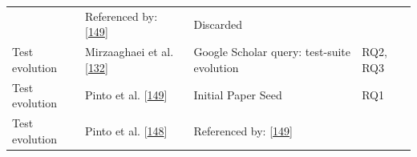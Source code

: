 \documentclass[]{book}
\begin{document}
\begin{longtable}[]{@{}llll@{}}
\begin{minipage}[t]{0.16\columnwidth}
\end{minipage} & \begin{minipage}[t]{0.50\columnwidth}\raggedright\strut
Referenced by:
{[}\protect\hyperlink{ref-pinto2012understanding}{149}{]}\strut
\end{minipage} & \begin{minipage}[t]{0.04\columnwidth}\raggedright\strut
Discarded\strut
\end{minipage}\tabularnewline
\begin{minipage}[t]{0.18\columnwidth}\raggedright\strut
Test evolution\strut
\end{minipage} & \begin{minipage}[t]{0.16\columnwidth}\raggedright\strut
Mirzaaghaei et al.
{[}\protect\hyperlink{ref-supportingtestsuite}{132}{]}\strut
\end{minipage} & \begin{minipage}[t]{0.50\columnwidth}\raggedright\strut
Google Scholar query: test-suite evolution\strut
\end{minipage} & \begin{minipage}[t]{0.04\columnwidth}\raggedright\strut
RQ2, RQ3\strut
\end{minipage}\tabularnewline
\begin{minipage}[t]{0.18\columnwidth}\raggedright\strut
Test evolution\strut
\end{minipage} & \begin{minipage}[t]{0.16\columnwidth}\raggedright\strut
Pinto et al.
{[}\protect\hyperlink{ref-pinto2012understanding}{149}{]}\strut
\end{minipage} & \begin{minipage}[t]{0.50\columnwidth}\raggedright\strut
Initial Paper Seed\strut
\end{minipage} & \begin{minipage}[t]{0.04\columnwidth}\raggedright\strut
RQ1\strut
\end{minipage}\tabularnewline
\begin{minipage}[t]{0.18\columnwidth}\raggedright\strut
Test evolution\strut
\end{minipage} & \begin{minipage}[t]{0.16\columnwidth}\raggedright\strut
Pinto et al. {[}\protect\hyperlink{ref-pinto2013}{148}{]}\strut
\end{minipage} & \begin{minipage}[t]{0.50\columnwidth}\raggedright\strut
Referenced by:
{[}\protect\hyperlink{ref-pinto2012understanding}{149}{]}\strut
\end{minipage} & \begin{minipage}[t]{0.04\columnwidth}\raggedright\strut

\end{minipage}
\end{longtable}
\end{document}
